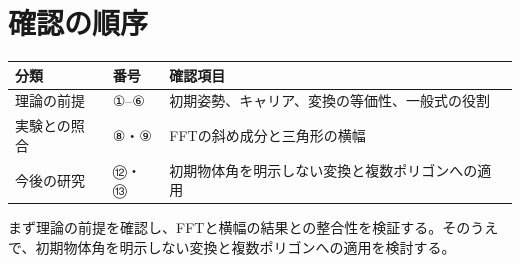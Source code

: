 \documentclass[a4paper,10pt]{ltjsarticle}
\begin{document}
\section{確認の順序}
\begin{center}
\begin{tabular}{@{}lll@{}}
\toprule
分類 & 番号 & 確認項目\\
\midrule
理論の前提 & ①--⑥ & 初期姿勢、キャリア、変換の等価性、一般式の役割\\
実験との照合 & ⑧・⑨ & FFTの斜め成分と三角形の横幅\\
今後の研究 & ⑫・⑬ & 初期物体角を明示しない変換と複数ポリゴンへの適用\\
\bottomrule
\end{tabular}
\end{center}
まず理論の前提を確認し、FFTと横幅の結果との整合性を検証する。そのうえで、初期物体角を明示しない変換と複数ポリゴンへの適用を検討する。
\end{document}
